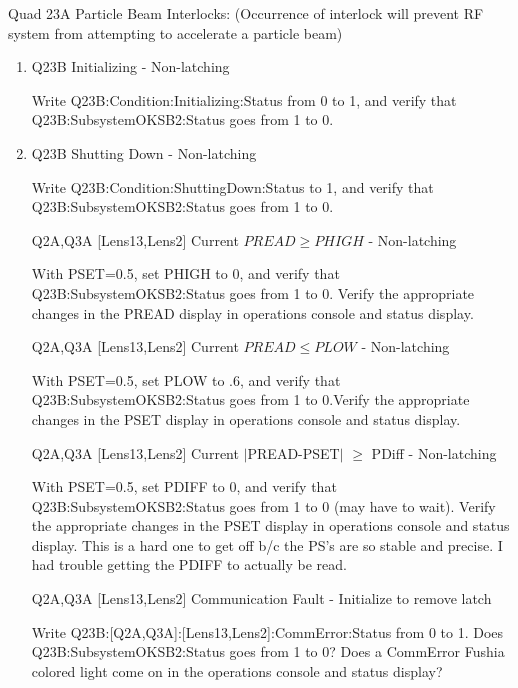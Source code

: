 \documentclass[11pt]{book}		%
\begin{document}
Quad 23A Particle Beam Interlocks:
(Occurrence of interlock will prevent RF system from attempting to accelerate a particle beam)

\begin{enumerate}
 \item Q23B Initializing - Non-latching

\color{red}
Write Q23B:Condition:Initializing:Status from 0 to 1, and verify that Q23B:SubsystemOKSB2:Status goes from 1 to 0.
\color{black}

 \item Q23B Shutting Down - Non-latching

\color{red}
Write Q23B:Condition:ShuttingDown:Status to 1, and verify that Q23B:SubsystemOKSB2:Status goes from 1 to 0.
\color{black}


 \item [Q2A,Q3A] [Lens13,Lens2] Current $PREAD \geq PHIGH$ - Non-latching

\color{red}
With PSET=0.5, set PHIGH to 0, and verify that Q23B:SubsystemOKSB2:Status goes from 1 to 0. Verify the appropriate changes in the PREAD display in operations console and status display.
\color{black}

 \item [Q2A,Q3A] [Lens13,Lens2] Current $PREAD \leq PLOW$ - Non-latching

\color{red}
With PSET=0.5, set PLOW to .6, and verify that Q23B:SubsystemOKSB2:Status goes from 1 to 0.Verify the appropriate changes in the PSET display in operations console and status display.
\color{black}

 \item [Q2A,Q3A] [Lens13,Lens2] Current $\mid$PREAD-PSET$\mid$  $\geq$ PDiff - Non-latching

\color{red}
With PSET=0.5, set PDIFF to 0, and verify that Q23B:SubsystemOKSB2:Status goes from 1 to 0 (may have to wait). Verify the appropriate changes in the PSET display in operations console and status display. This is a hard one to get off b/c the PS's are so stable and precise. I had trouble getting the PDIFF to actually be read.
\color{black}

 \item [Q2A,Q3A] [Lens13,Lens2] Communication Fault - Initialize to remove latch

\color{red}
Write Q23B:[Q2A,Q3A]:[Lens13,Lens2]:CommError:Status from 0 to 1. Does Q23B:SubsystemOKSB2:Status goes from 1 to 0? Does a CommError Fushia colored light come on in the operations console and status display?
\color{black}


\end{enumerate}
\end{document}
